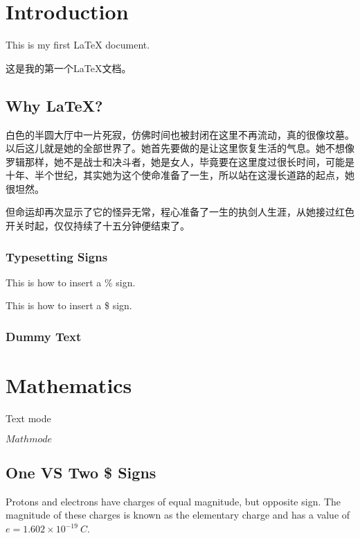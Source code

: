 \documentclass[]{report}
\begin{document}
\tableofcontents
\listoffigures
\listoftables

\chapter{Introduction}

This is my first LaTeX document.

这是我的第一个LaTeX文档。

\section{Why LaTeX?}

白色的半圆大厅中一片死寂，仿佛时间也被封闭在这里不再流动，真的很像坟墓。以后这儿就是她的全部世界了。她首先要做的是让这里恢复生活的气息。她不想像罗辑那样，她不是战士和决斗者，她是女人，毕竟要在这里度过很长时间，可能是十年、半个世纪，其实她为这个使命准备了一生，所以站在这漫长道路的起点，她很坦然。

但命运却再次显示了它的怪异无常，程心准备了一生的执剑人生涯，从她接过红色开关时起，仅仅持续了十五分钟便结束了。

\subsection{Typesetting Signs}

This is how to insert a \% sign.

This is how to insert a \$ sign.

\subsection{Dummy Text}

\lipsum

\chapter{Mathematics}

Text mode

$Math mode$

\section{One VS Two \$ Signs}

Protons and electrons have charges of equal magnitude, but opposite sign. The magnitude of these charges is known as the elementary charge and has a value of $e=1.602\times 10^{-19}\ C$.
\end{document}

